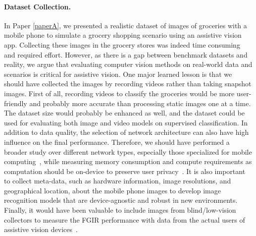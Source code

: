 \paragraph{Dataset Collection.} In Paper \ref{paperA}, we presented a realistic dataset of images of groceries with a mobile phone to simulate a grocery shopping scenario using an assistive vision app. Collecting these images in the grocery stores was indeed time consuming and required effort. However, as there is a gap between benchmark datasets and reality, we argue that evaluating computer vision methods on real-world data and scenarios is critical for assistive vision. One major learned lesson is that we should have collected the images by recording videos rather than taking snapshot images. First of all, recording videos to classify the groceries would be more user-friendly and probably more accurate than processing static images one at a time. The dataset size would probably be enhanced as well, and the dataset could be used for evaluating both image and video models on supervised classification. In addition to data quality, the selection of network architecture can also have high influence on the final performance. Therefore, we should have performed a broader study over different network types, especially those specialized for mobile computing~\cite{howard2017mobilenets,tan2019efficientnet}, while measuring memory consumption and compute requirements as computation should be on-device to preserve user privacy~\cite{hayes2022online}. It is also important to collect meta-data, such as  hardware information, image resolutions, and geographical location, about the mobile phone images to develop image recognition models that are device-agnostic and robust in new environments. Finally, it would have been valuable to include images from blind/low-vision collectors to measure the FGIR performance with data from the actual users of assistive vision devices~\cite{theodorou2021disability}. 


